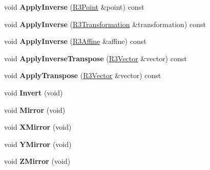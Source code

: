 \begin{DoxyCompactItemize}
\item 
void {\bfseries Apply\+Inverse} (\hyperlink{class_r3_point}{R3\+Point} \&point) const \hypertarget{class_r3_affine_abff1abd39987570b6c7fc83f6c0f6a30}{}\label{class_r3_affine_abff1abd39987570b6c7fc83f6c0f6a30}

\item 
void {\bfseries Apply\+Inverse} (\hyperlink{class_r3_transformation}{R3\+Transformation} \&transformation) const \hypertarget{class_r3_affine_a9bb65026888ac5e99b28fd263bbfcaa5}{}\label{class_r3_affine_a9bb65026888ac5e99b28fd263bbfcaa5}

\item 
void {\bfseries Apply\+Inverse} (\hyperlink{class_r3_affine}{R3\+Affine} \&affine) const \hypertarget{class_r3_affine_ab369797f3b1afec85aacee31f50e6c23}{}\label{class_r3_affine_ab369797f3b1afec85aacee31f50e6c23}

\item 
void {\bfseries Apply\+Inverse\+Transpose} (\hyperlink{class_r3_vector}{R3\+Vector} \&vector) const \hypertarget{class_r3_affine_a7eabc4b0c0c8589f03a86f1694905521}{}\label{class_r3_affine_a7eabc4b0c0c8589f03a86f1694905521}

\item 
void {\bfseries Apply\+Transpose} (\hyperlink{class_r3_vector}{R3\+Vector} \&vector) const \hypertarget{class_r3_affine_a7c7ff9a4db2a72f5a3e6835a1a7a463f}{}\label{class_r3_affine_a7c7ff9a4db2a72f5a3e6835a1a7a463f}

\item 
void {\bfseries Invert} (void)\hypertarget{class_r3_affine_aed96b66fb075c823347832424bbe19c8}{}\label{class_r3_affine_aed96b66fb075c823347832424bbe19c8}

\item 
void {\bfseries Mirror} (void)\hypertarget{class_r3_affine_ac9aa9ea7283efb89df643b6a9fe5e75d}{}\label{class_r3_affine_ac9aa9ea7283efb89df643b6a9fe5e75d}

\item 
void {\bfseries X\+Mirror} (void)\hypertarget{class_r3_affine_a4d23c4ee8a5af5f29658a3418eef5d3d}{}\label{class_r3_affine_a4d23c4ee8a5af5f29658a3418eef5d3d}

\item 
void {\bfseries Y\+Mirror} (void)\hypertarget{class_r3_affine_aac741a2db84153c782a81723a9afa13f}{}\label{class_r3_affine_aac741a2db84153c782a81723a9afa13f}

\item 
void {\bfseries Z\+Mirror} (void)\hypertarget{class_r3_affine_ad496305c4367e6524110458f8afeeee6}{}\label{class_r3_affine_ad496305c4367e6524110458f8afeeee6}


\end{DoxyCompactItemize}
